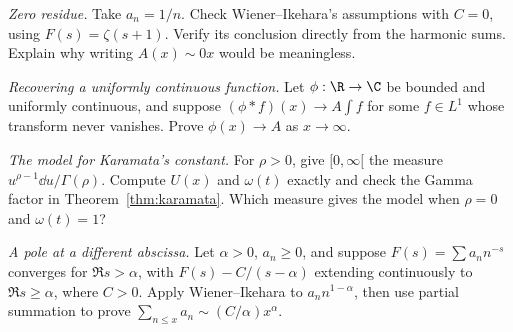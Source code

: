 \begin{exercise}[$\star$]\label{ex:v8c15a}
\emph{Zero residue.} Take $a_n=1/n$. Check Wiener--Ikehara's assumptions with $C=0$, using $F(s)=\zeta(s+1)$. Verify its conclusion directly from the harmonic sums. Explain why writing $A(x)\sim0x$ would be meaningless.
\end{exercise}
\begin{exercise}[$\star\star$]\label{ex:v8c15b}
\emph{Recovering a uniformly continuous function.} Let $\phi:\R\to\C$ be bounded and uniformly continuous, and suppose $(\phi*f)(x)\to A\int f$ for some $f\in L^1$ whose transform never vanishes. Prove $\phi(x)\to A$ as $x\to\infty$.
\end{exercise}
\begin{exercise}[$\star$]\label{ex:v8c15c}
\emph{The model for Karamata's constant.} For $\rho>0$, give $[0,\infty[$ the measure $u^{\rho-1}\dd u/\Gamma(\rho)$. Compute $U(x)$ and $\omega(t)$ exactly and check the Gamma factor in Theorem~\ref{thm:karamata}. Which measure gives the model when $\rho=0$ and $\omega(t)=1$?
\end{exercise}
\begin{exercise}[$\star\star$]\label{ex:v8c15d}
\emph{A pole at a different abscissa.} Let $\alpha>0$, $a_n\ge0$, and suppose $F(s)=\sum a_nn^{-s}$ converges for $\Re s>\alpha$, with $F(s)-C/(s-\alpha)$ extending continuously to $\Re s\ge\alpha$, where $C>0$. Apply Wiener--Ikehara to $a_nn^{1-\alpha}$, then use partial summation to prove $\sum_{n\le x}a_n\sim(C/\alpha)x^\alpha$.
\end{exercise}

